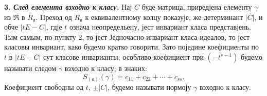 \documentclass[11pt]{article}
\begin{document}
\setcounter{footnote}{26}

\textbf{3. \emph{След елемента взходно к класу.}} Нај $C$ буде матрица, приредјена елементу $\gamma$ из $\mathfrak R$ в $R_{\mathfrak a}$. Преход од $R_{\mathfrak a}$ к еквивалентному колцу показује, же детерминант $|C|$, и обче $|tE-C|$, гдје $t$ означа неопредельену, јест инвариант класа представјень. Тым самым, по пункту 2, то јест Једночасно инвариант класа идеалов, то јест класовы инвариант, како будемо кратко говорити. Зато поједине коефициенты по $t$ в $|tE-C|$ сут класове инварианты; особливо коефициент при $(-t^{s-1})$ будемо называти следом $\gamma$ взходно к класу; в знаких:
\[
        S_{(\mathfrak a)}(\gamma)=c_{11}+c_{22}+\cdots+c_{ss}.
\]
Коефициент свободны од $t$, $\pm |C|$, будемо называти нормоју $\gamma$ взходно к класу.
\end{document}
